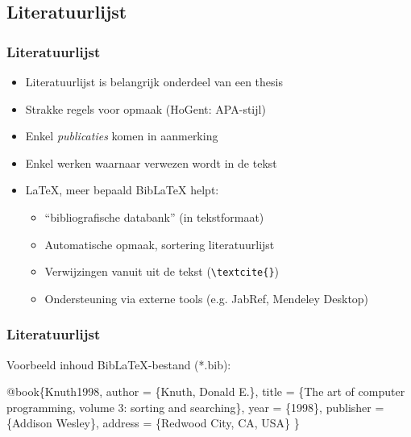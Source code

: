 \documentclass[aspectratio=169]{beamer}
\begin{document}
\subsection{Literatuurlijst}

\begin{frame}[fragile]
  \frametitle{Literatuurlijst}
  
  \begin{itemize}
    \item<+-> Literatuurlijst is belangrijk onderdeel van een thesis
    \item<+-> Strakke regels voor opmaak (HoGent: APA-stijl)
    \item<+-> Enkel \emph{publicaties} komen in aanmerking
    \item<+-> Enkel werken waarnaar verwezen wordt in de tekst
    \item<+-> {\LaTeX}, meer bepaald Bib{\LaTeX} helpt:
    \begin{itemize}
      \item<+-> ``bibliografische databank'' (in tekstformaat)
      \item<+-> Automatische opmaak, sortering literatuurlijst
      \item<+-> Verwijzingen vanuit uit de tekst (\verb|\textcite{}|)
      \item<+-> Ondersteuning via externe tools (e.g. JabRef, Mendeley Desktop)
    \end{itemize} 
  \end{itemize}
\end{frame}

\begin{frame}[fragile]
  \frametitle{Literatuurlijst}
  
  Voorbeeld inhoud Bib{\LaTeX}-bestand (*.bib):
  
  \begin{semiverbatim}
    \alert<2>{@book}\{\alert<4>{Knuth1998},
    \alert<3>{author} = \{Knuth, Donald E.\},
    \alert<3>{title} = \{The art of computer programming,  volume 3:
    sorting and searching\},
    \alert<3>{year} = \{1998\},
    publisher = \{Addison Wesley\},
    address = \{Redwood City, CA, USA\}
    \} 
  \end{semiverbatim}
  
  
\end{frame}
\end{document}
